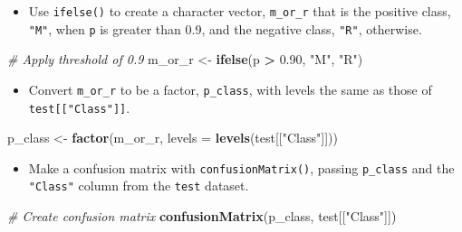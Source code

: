 \documentclass[]{book}
\newenvironment{Shaded}{\begin{snugshade}}{\end{snugshade}}
\newcommand{\KeywordTok}[1]{\textcolor[rgb]{0.13,0.29,0.53}{\textbf{#1}}}
\newcommand{\DataTypeTok}[1]{\textcolor[rgb]{0.13,0.29,0.53}{#1}}
\newcommand{\FloatTok}[1]{\textcolor[rgb]{0.00,0.00,0.81}{#1}}
\newcommand{\StringTok}[1]{\textcolor[rgb]{0.31,0.60,0.02}{#1}}
\newcommand{\CommentTok}[1]{\textcolor[rgb]{0.56,0.35,0.01}{\textit{#1}}}
\newcommand{\OperatorTok}[1]{\textcolor[rgb]{0.81,0.36,0.00}{\textbf{#1}}}
\newcommand{\NormalTok}[1]{#1}
\providecommand{\tightlist}{%
  \setlength{\itemsep}{0pt}\setlength{\parskip}{0pt}}
\begin{document}
\begin{itemize}
\tightlist
\item
  Use \texttt{ifelse()} to create a character vector, \texttt{m\_or\_r}
  that is the positive class, \texttt{"M"}, when \texttt{p} is greater
  than 0.9, and the negative class, \texttt{"R"}, otherwise.
\end{itemize}

\begin{Shaded}
\begin{Highlighting}[]
\CommentTok{# Apply threshold of 0.9}
\NormalTok{m_or_r <-}\StringTok{ }\KeywordTok{ifelse}\NormalTok{(p }\OperatorTok{>}\StringTok{ }\FloatTok{0.90}\NormalTok{, }\StringTok{"M"}\NormalTok{, }\StringTok{"R"}\NormalTok{)}
\end{Highlighting}
\end{Shaded}

\begin{itemize}
\tightlist
\item
  Convert \texttt{m\_or\_r} to be a factor, \texttt{p\_class}, with
  levels the same as those of \texttt{test{[}{[}"Class"{]}{]}}.
\end{itemize}

\begin{Shaded}
\begin{Highlighting}[]
\NormalTok{p_class <-}\StringTok{ }\KeywordTok{factor}\NormalTok{(m_or_r, }\DataTypeTok{levels =} \KeywordTok{levels}\NormalTok{(test[[}\StringTok{"Class"}\NormalTok{]]))}
\end{Highlighting}
\end{Shaded}

\begin{itemize}
\tightlist
\item
  Make a confusion matrix with \texttt{confusionMatrix()}, passing
  \texttt{p\_class} and the \texttt{"Class"} column from the
  \texttt{test} dataset.
\end{itemize}

\begin{Shaded}
\begin{Highlighting}[]
\CommentTok{# Create confusion matrix}
\KeywordTok{confusionMatrix}\NormalTok{(p_class, test[[}\StringTok{"Class"}\NormalTok{]])}
\end{Highlighting}
\end{Shaded}
\end{document}

